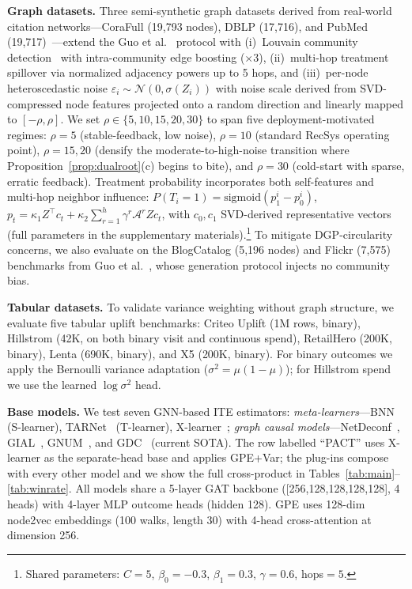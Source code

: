 \documentclass[sigconf,anonymous,review]{acmart}
\begin{document}
\textbf{Graph datasets.} Three semi-synthetic graph datasets derived from real-world citation networks---CoraFull (19{,}793 nodes), DBLP (17{,}716), and PubMed (19{,}717)~\cite{bojchevski2018deep}---extend the Guo et al.~\cite{guo2020learning} protocol with (i)~Louvain community detection~\cite{blondel2008fast} with intra-community edge boosting ($\times 3$), (ii)~multi-hop treatment spillover via normalized adjacency powers up to 5 hops, and (iii)~per-node heteroscedastic noise $\varepsilon_i \sim \mathcal{N}(0, \sigma(Z_i))$ with noise scale derived from SVD-compressed node features projected onto a random direction and linearly mapped to $[-\rho, \rho]$. We set $\rho \in \{5, 10, 15, 20, 30\}$ to span five deployment-motivated regimes: $\rho{=}5$ (stable-feedback, low noise), $\rho{=}10$ (standard RecSys operating point), $\rho{=}15, 20$ (densify the moderate-to-high-noise transition where Proposition~\ref{prop:dualroot}(c) begins to bite), and $\rho{=}30$ (cold-start with sparse, erratic feedback). Treatment probability incorporates both self-features and multi-hop neighbor influence: $P(T_i{=}1) = \mathrm{sigmoid}(p_1^i - p_0^i)$, $p_t = \kappa_1 Z^\top c_t + \kappa_2 \sum_{r=1}^{h} \gamma^r \mathcal{A}^r Z c_t$, with $c_0, c_1$ SVD-derived representative vectors (full parameters in the supplementary materials).\footnote{Shared parameters: $C{=}5$, $\beta_0{=}{-}0.3$, $\beta_1{=}0.3$, $\gamma{=}0.6$, hops${=}5$.} To mitigate DGP-circularity concerns, we also evaluate on the BlogCatalog (5{,}196 nodes) and Flickr (7{,}575) benchmarks from Guo et al.~\cite{guo2020learning}, whose generation protocol injects no community bias.

\textbf{Tabular datasets.} To validate variance weighting without graph structure, we evaluate five tabular uplift benchmarks: Criteo Uplift (1M rows, binary), Hillstrom (42K, on both binary visit and continuous spend), RetailHero (200K, binary), Lenta (690K, binary), and X5 (200K, binary). For binary outcomes we apply the Bernoulli variance adaptation ($\sigma^2 = \mu(1-\mu)$); for Hillstrom spend we use the learned $\log\sigma^2$ head.

\textbf{Base models.} We test seven GNN-based ITE estimators: \emph{meta-learners}---BNN~\cite{johansson2016learning} (S-learner), TARNet~\cite{shalit2017estimating} (T-learner), X-learner~\cite{kunzel2019metalearners}; \emph{graph causal models}---NetDeconf~\cite{guo2020learning}, GIAL~\cite{chu2021graph}, GNUM~\cite{zhu2023gnum}, and GDC~\cite{hu2025gdc} (current SOTA). The row labelled ``PACT'' uses X-learner as the separate-head base and applies GPE+Var; the plug-ins compose with every other model and we show the full cross-product in Tables~\ref{tab:main}--\ref{tab:winrate}. All models share a 5-layer GAT backbone ([256,128,128,128,128], 4 heads) with 4-layer MLP outcome heads (hidden 128). GPE uses 128-dim node2vec embeddings (100 walks, length 30) with 4-head cross-attention at dimension 256.
\end{document}
